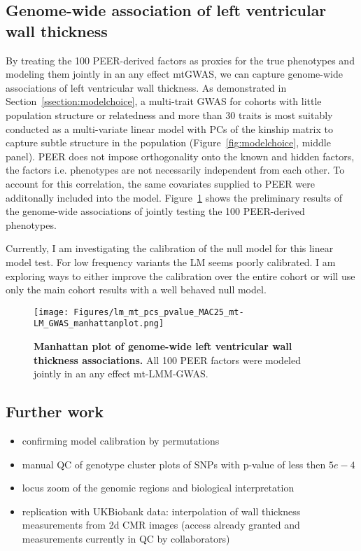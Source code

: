 \subsection{Genome-wide association of left ventricular wall thickness}
By treating the 100 PEER-derived factors as proxies for the true phenotypes and modeling them jointly in an any effect mtGWAS, we can capture genome-wide associations of left ventricular wall thickness. As demonstrated in Section~\ref{ssection:modelchoice}, a multi-trait GWAS for cohorts with little population structure or relatedness and more than 30 traits is most suitably conducted as a multi-variate linear model with PCs of the kinship matrix to capture subtle structure in the population (Figure~\ref{fig:modelchoice}, middle panel). PEER does not impose orthogonality onto the known and hidden factors, the factors i.e. phenotypes are not necessarily independent from each other. To account for this correlation, the same covariates supplied to PEER were additonally included into the model. Figure~\ref{fig:GWAS-pheno3D} shows the preliminary results of the genome-wide associations of jointly testing the 100 PEER-derived phenotypes. 

Currently, I am investigating the calibration of the null model for this linear model test. For low frequency variants the LM seems poorly calibrated. I am exploring ways to either improve the calibration over the entire cohort or will use only the main cohort results with a well behaved null model.

\begin{figure}[hbtp]
	\centering
	\texttt{[image: Figures/lm\_mt\_pcs\_pvalue\_MAC25\_mt-LM\_GWAS\_manhattanplot.png]}
	\caption{\textbf{Manhattan plot of genome-wide left ventricular wall thickness associations.} All 100 PEER factors were modeled jointly in an any effect mt-LMM-GWAS.}
 	\label{fig:GWAS-pheno3D}
\end{figure}

\subsection{Further work}
\begin{itemize}
\item confirming model calibration by permutations
\item manual QC of genotype cluster plots of SNPs with p-value of less then $5e-4$
\item locus zoom of the genomic regions and biological interpretation
\item replication with UKBiobank data: interpolation of wall thickness measurements from 2d CMR images (access already granted and measurements currently in QC by collaborators)
\end{itemize}